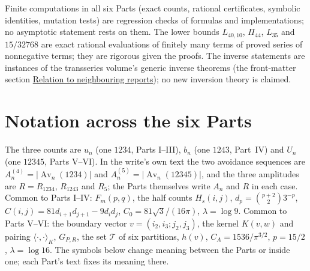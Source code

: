 \documentclass[11pt,letterpaper]{article}
\theoremstyle{remark}\newtheorem{remark}[theorem]{Remark}
\numberwithin{equation}{section}
\newcommand{\Av}{\operatorname{Av}}
\newcommand{\Tset}{\mathcal T}
\begin{document}
\endgroup
Finite computations in all six Parts (exact counts, rational certificates, symbolic identities, mutation tests) are regression checks of formulas and implementations; no asymptotic statement rests on them. The lower bounds $L_{40,10}$, $\Pi_{44}$, $L_{35}$ and $15/32768$ are exact rational evaluations of finitely many terms of proved series of nonnegative terms; they are rigorous given the proofs. The inverse statements are instances of the transseries volume's generic inverse theorems (the front-matter section \hyperref[upo:sec:neighbours]{Relation to neighbouring reports}); no new inversion theory is claimed.

\section*{Notation across the six Parts}\label{upo:sec:notation}
The three counts are $u_n$ (one $1234$, Parts I--III), $b_n$ (one $1243$, Part~IV) and $U_n$ (one $12345$, Parts V--VI). In the write's own text the two avoidance sequences are $A^{(4)}_n=|\Av_n(1234)|$ and $A^{(5)}_n=|\Av_n(12345)|$, and the three amplitudes are $R=R_{1234}$, $R_{1243}$ and $R_5$; the Parts themselves write $A_n$ and $R$ in each case. Common to Parts I--IV: $F_m(p,q)$, the half counts $H_s(i,j)$, $d_p=\binom{p+2}2 3^{-p}$, $C(i,j)=81d_{i+1}d_{j+1}-9d_id_j$, $C_0=81\sqrt3/(16\pi)$, $\lambda=\log 9$. Common to Parts V--VI: the boundary vector $v=(i_2,i_3;j_2,j_3)$, the kernel $K(v,w)$ and pairing $\langle\cdot,\cdot\rangle_K$, $G_{P,R}$, the set $\Tset$ of six partitions, $h(v)$, $C_A=1536/\pi^{3/2}$, $p=15/2$, $\lambda=\log16$. The symbols below change meaning between the Parts or inside one; each Part's text fixes its meaning there.
\begingroup\small
\end{document}
